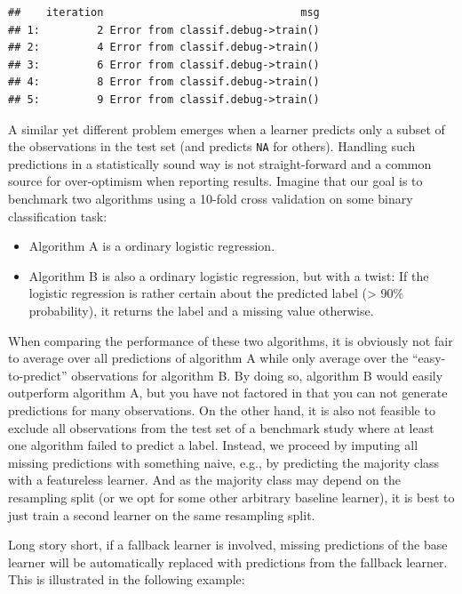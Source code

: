 \documentclass[
]{scrbook}
\providecommand{\tightlist}{%
  \setlength{\itemsep}{0pt}\setlength{\parskip}{0pt}}
\begin{document}
\begin{verbatim}
##    iteration                               msg
## 1:         2 Error from classif.debug->train()
## 2:         4 Error from classif.debug->train()
## 3:         6 Error from classif.debug->train()
## 4:         8 Error from classif.debug->train()
## 5:         9 Error from classif.debug->train()
\end{verbatim}

A similar yet different problem emerges when a learner predicts only a subset of the observations in the test set (and predicts \texttt{NA} for others).
Handling such predictions in a statistically sound way is not straight-forward and a common source for over-optimism when reporting results.
Imagine that our goal is to benchmark two algorithms using a 10-fold cross validation on some binary classification task:

\begin{itemize}
\tightlist
\item
  Algorithm A is a ordinary logistic regression.
\item
  Algorithm B is also a ordinary logistic regression, but with a twist:
  If the logistic regression is rather certain about the predicted label (\textgreater{} 90\% probability), it returns the label and a missing value otherwise.
\end{itemize}

When comparing the performance of these two algorithms, it is obviously not fair to average over all predictions of algorithm A while only average over the ``easy-to-predict'' observations for algorithm B.
By doing so, algorithm B would easily outperform algorithm A, but you have not factored in that you can not generate predictions for many observations.
On the other hand, it is also not feasible to exclude all observations from the test set of a benchmark study where at least one algorithm failed to predict a label.
Instead, we proceed by imputing all missing predictions with something naive, e.g., by predicting the majority class with a featureless learner.
And as the majority class may depend on the resampling split (or we opt for some other arbitrary baseline learner), it is best to just train a second learner on the same resampling split.

Long story short, if a fallback learner is involved, missing predictions of the base learner will be automatically replaced with predictions from the fallback learner.
This is illustrated in the following example:
\end{document}
